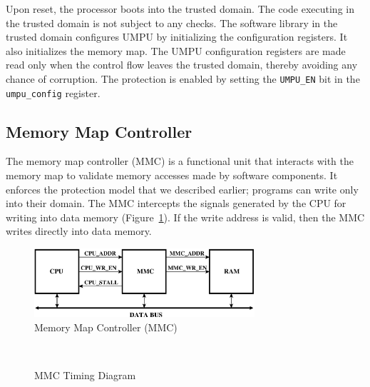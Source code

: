 Upon reset, the processor boots into the trusted domain.
%
The code executing in the trusted domain is not subject to any checks.
%
The software library in the trusted domain configures UMPU by
initializing the configuration registers.
%
It also initializes the memory map.
%
The UMPU configuration registers are made read only when the control
flow leaves the trusted domain, thereby avoiding any chance of
corruption.
%
The protection is enabled by setting the \texttt{UMPU\_EN} bit in the
\texttt{umpu\_config} register.
%
%
\subsection{Memory Map Controller}
\label{sec:mmc}
%
The memory map controller (MMC) is a functional unit that interacts with
the memory map to validate memory accesses made by software
components.
%
It enforces the protection model that we described earlier; programs
can write only into their domain.
%
The MMC intercepts the signals generated by the CPU for writing into
data memory (Figure~\ref{fig:mmcramcpu}).
%
If the write address is valid, then the MMC writes directly into data
memory.
%
\begin{figure}[htbp]
   \centering
   \includegraphics[height=1in,
   keepaspectratio=true]{figures/mmcramcpu.eps} 
   \caption{Memory Map Controller (MMC)}
   \label{fig:mmcramcpu}
\end{figure}
%
\begin{figure}[htpb]
 \centering
  \mbox{
    \hspace{0.2in}
  }
  \caption{MMC Timing Diagram}
\end{figure}   
